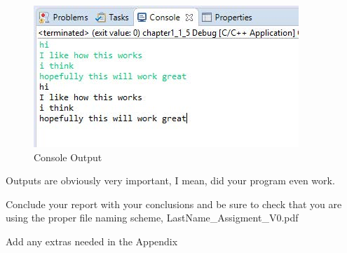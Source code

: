 \documentclass[11pt]{ECEtemp}
\begin{document}
\begin{figure}[!htb]
    \centering
    \includegraphics[scale=1]{img/fig_console_output.jpg}
    \caption{Console Output}
    \label{fig_figure_2}
\end{figure}

Outputs are obviously very important, I mean, did your program even work.

Conclude your report with your conclusions and be sure to check that you are using the proper file naming scheme, LastName\_Assigment\_V0.pdf

Add any extras needed in the Appendix

\centering

\end{document}
